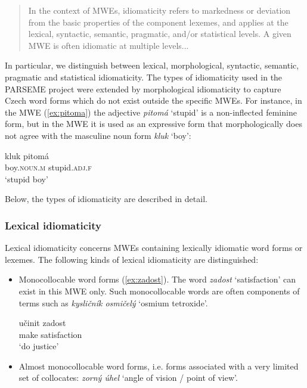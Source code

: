 \documentclass[output=paper,colorlinks,citecolor=brown]{langscibook}
\begin{document}
\begin{quote}
    In the context of MWEs, idiomaticity refers to markedness or deviation from the  basic  properties  of  the  component  lexemes,  and  applies  at  the  lexical, syntactic, semantic, pragmatic,  and/or  statistical  levels.   A  given  MWE  is often idiomatic at multiple levels... \citep[4]{baldwin2010multiword}
\end{quote}
In particular, we distinguish between lexical, morphological, syntactic, semantic, pragmatic and statistical idiomaticity. The types of idiomaticity used in the PARSEME project were extended by morphological idiomaticity to capture Czech word forms which do not exist outside the specific MWEs. For instance, in the MWE (\ref{ex:pitoma}) the adjective \emph{pitomá} ‘stupid’ is a non-inflected feminine form, but
in the MWE it is used as an expressive form that morphologically does not agree with the masculine noun form \emph{kluk} ‘boy’:

\ea \label{ex:pitoma}
\gll kluk pitomá\\
     boy.\textsc{noun}.\textsc{m} stupid.\textsc{adj}.\textsc{f}\\
\glt `stupid boy'
\z

\noindent
Below, the types of idiomaticity are described in detail.\largerpage

\subsubsection{Lexical idiomaticity}
\label{sec:idiom-lexical}
Lexical idiomaticity concerns MWEs containing lexically
idiomatic word forms or lexemes. The following kinds of lexical
idiomaticity are distinguished:

\begin{itemize}
    \item Monocollocable word forms (\ref{ex:zadost}). The word \emph{zadost} ‘satisfaction’ can exist in this MWE only. Such monocollocable words are often components of terms such as \emph{kysličník osmičelý} ‘osmium tetroxide’. 


\ea \label{ex:zadost}
\gll učinit zadost\\
     make satisfaction\\
\glt `do justice'
\z
    
    
\end{itemize}

\begin{itemize}
    \item Almost monocollocable word forms, i.e. forms associated with a very
limited set of collocates: \emph{zorný úhel} ‘angle of vision / point of view’.

    
\end{itemize}
\end{document}

